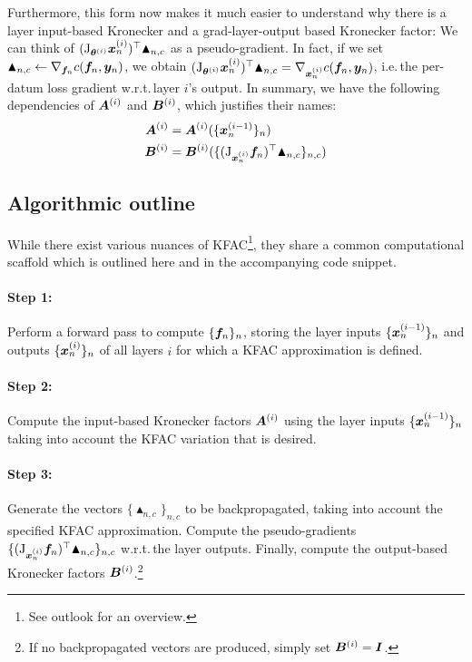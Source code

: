 Furthermore, this form now makes it much easier to understand why there is a layer input-based Kronecker and a grad-layer-output based Kronecker factor: We can think of $(\mathrm{J}_{{\bm{\theta}}^{(i)}} {\bm{x}}_n^{(i)})^{\top} \blacktriangle_{n,c}$ as a pseudo-gradient. In fact, if we set $\blacktriangle_{n,c} \leftarrow \nabla_{{\bm{f}}_n} c({\bm{f}}_n, {\bm{y}}_n)$, we obtain $(\mathrm{J}_{{\bm{\theta}}^{(i)}} {\bm{x}}_n^{(i)})^{\top} \blacktriangle_{n,c} = \nabla_{{\bm{x}}_n^{(i)}} c({\bm{f}}_n, {\bm{y}}_n)$, i.e.\,the per-datum loss gradient w.r.t.\,layer $i$'s output.
In summary, we have the following dependencies of ${\bm{A}}^{(i)}$ and ${\bm{B}}^{(i)}$, which justifies their names:
\begin{align*}
  {\bm{A}}^{(i)} &= {\bm{A}}^{(i)}( \{{\bm{x}}_{n}^{(i-1)}\}_n )
  \\
  {\bm{B}}^{(i)} &= {\bm{B}}^{(i)}( \{ (\mathrm{J}_{{\bm{x}}_n^{(i)}}{\bm{f}}_{n})^{\top} \blacktriangle_{n,c}\}_{n,c})
\end{align*}

\subsection{Algorithmic outline}

While there exist various nuances of KFAC\footnote{See outlook for an overview.}, they share a common computational scaffold which is outlined here and in the accompanying code snippet.

\paragraph{Step 1:} Perform a forward pass to compute $\{{\bm{f}}_n\}_n $, storing the layer inputs $\{{\bm{x}}_n^{(i-1)} \}_n$ and outputs $\{{\bm{x}}_n^{(i)}\}_n$ of all layers $i$ for which a KFAC approximation is defined.

\paragraph{Step 2:} Compute the input-based Kronecker factors ${\bm{A}}^{(i)}$ using the layer inputs $\{{\bm{x}}_n^{(i-1)}\}_n$ taking into account the KFAC variation that is desired.

\paragraph{Step 3:} Generate the vectors $\{\blacktriangle_{n,c}\}_{n,c}$ to be backpropagated, taking into account the specified KFAC approximation. Compute the pseudo-gradients $\{(\mathrm{J}_{{\bm{x}}_n^{(i)}} {\bm{f}}_n)^{\top} \blacktriangle_{n,c} \}_{n,c}$ w.r.t.\,the layer outputs. Finally, compute the output-based Kronecker factors ${\bm{B}}^{(i)}$.\footnote{If no backpropagated vectors are produced, simply set ${\bm{B}}^{(i)} = {\bm{I}}$.}

